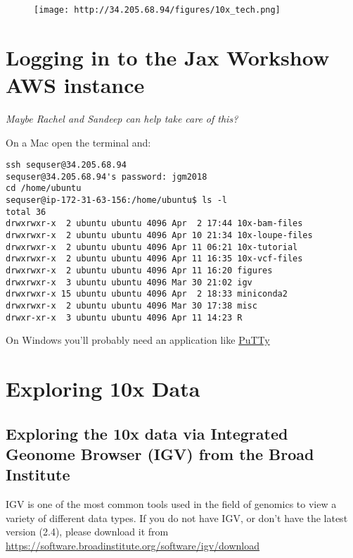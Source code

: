\documentclass[]{article}
\begin{document}
\begin{figure}[htbp]
\centering
\texttt{[image: http://34.205.68.94/figures/10x\_tech.png]}
\caption{}
\end{figure}

\section{\texorpdfstring{\textbf{Logging in to the Jax Workshow AWS
instance}}{Logging in to the Jax Workshow AWS instance}}\label{logging-in-to-the-jax-workshow-aws-instance}

\emph{Maybe Rachel and Sandeep can help take care of this?}

On a Mac open the terminal and:

\begin{verbatim}
ssh sequser@34.205.68.94
sequser@34.205.68.94's password: jgm2018
cd /home/ubuntu
sequser@ip-172-31-63-156:/home/ubuntu$ ls -l
total 36
drwxrwxr-x  2 ubuntu ubuntu 4096 Apr  2 17:44 10x-bam-files
drwxrwxr-x  2 ubuntu ubuntu 4096 Apr 10 21:34 10x-loupe-files
drwxrwxr-x  2 ubuntu ubuntu 4096 Apr 11 06:21 10x-tutorial
drwxrwxr-x  2 ubuntu ubuntu 4096 Apr 11 16:35 10x-vcf-files
drwxrwxr-x  2 ubuntu ubuntu 4096 Apr 11 16:20 figures
drwxrwxr-x  3 ubuntu ubuntu 4096 Mar 30 21:02 igv
drwxrwxr-x 15 ubuntu ubuntu 4096 Apr  2 18:33 miniconda2
drwxrwxr-x  2 ubuntu ubuntu 4096 Mar 30 17:38 misc
drwxr-xr-x  3 ubuntu ubuntu 4096 Apr 11 14:23 R
\end{verbatim}

On Windows you'll probably need an application like
\href{https://www.putty.org/}{PuTTy}

\section{\texorpdfstring{\textbf{Exploring 10x
Data}}{Exploring 10x Data}}\label{exploring-10x-data}

\subsection{\texorpdfstring{\textbf{Exploring the 10x data via
Integrated Geonome Browser (IGV) from the Broad
Institute}}{Exploring the 10x data via Integrated Geonome Browser (IGV) from the Broad Institute}}\label{exploring-the-10x-data-via-integrated-geonome-browser-igv-from-the-broad-institute}

IGV is one of the most common tools used in the field of genomics to
view a variety of different data types. If you do not have IGV, or don't
have the latest version (2.4), please download it from
\url{https://software.broadinstitute.org/software/igv/download}
\end{document}
